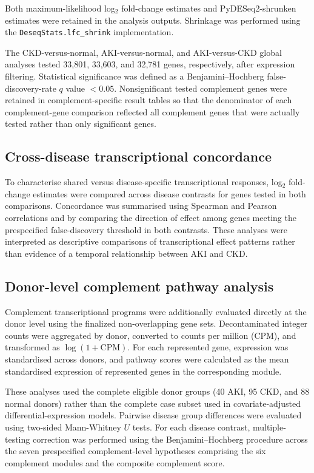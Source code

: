\documentclass[10pt,letterpaper]{article}
\begin{document}
Both maximum-likelihood log$_2$ fold-change estimates and PyDESeq2-shrunken estimates were retained in the analysis outputs. Shrinkage was performed using the \texttt{DeseqStats.lfc\_shrink} implementation.

The CKD-versus-normal, AKI-versus-normal, and AKI-versus-CKD global analyses tested 33,801, 33,603, and 32,781 genes, respectively, after expression filtering. Statistical significance was defined as a Benjamini--Hochberg false-discovery-rate $q$ value $<0.05$. Nonsignificant tested complement genes were retained in complement-specific result tables so that the denominator of each complement-gene comparison reflected all complement genes that were actually tested rather than only significant genes.

\subsection*{Cross-disease transcriptional concordance}

To characterise shared versus disease-specific transcriptional responses, log$_2$ fold-change estimates were compared across disease contrasts for genes tested in both comparisons. Concordance was summarised using Spearman and Pearson correlations and by comparing the direction of effect among genes meeting the prespecified false-discovery threshold in both contrasts. These analyses were interpreted as descriptive comparisons of transcriptional effect patterns rather than evidence of a temporal relationship between AKI and CKD.

\subsection*{Donor-level complement pathway analysis}

Complement transcriptional programs were additionally evaluated directly at the donor level using the finalized non-overlapping gene sets. Decontaminated integer counts were aggregated by donor, converted to counts per million (CPM), and transformed as $\log(1+\mathrm{CPM})$. For each represented gene, expression was standardised across donors, and pathway scores were calculated as the mean standardised expression of represented genes in the corresponding module.

These analyses used the complete eligible donor groups (40 AKI, 95 CKD, and 88 normal donors) rather than the complete case subset used in covariate-adjusted differential-expression models. Pairwise disease group differences were evaluated using two-sided Mann-Whitney $U$ tests. For each disease contrast, multiple-testing correction was performed using the Benjamini--Hochberg procedure across the seven prespecified complement-level hypotheses comprising the six complement modules and the composite complement score.
\end{document}

